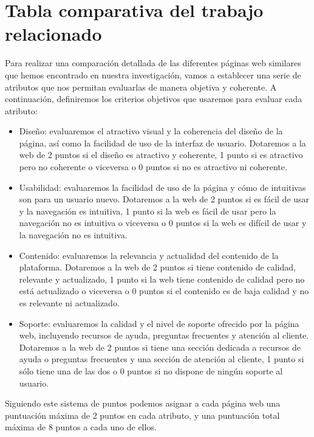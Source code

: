 \section{Tabla comparativa del trabajo relacionado}\label{sec:comparativa-trabajo-relacionado}

Para realizar una comparación detallada de las diferentes páginas web similares que hemos encontrado en nuestra investigación, vamos a establecer una serie de atributos que nos permitan evaluarlas de manera objetiva y coherente. A continuación, definiremos los criterios objetivos que usaremos para evaluar cada atributo:

\begin{itemize}

	\item Diseño: evaluaremos el atractivo visual y la coherencia del diseño de la página, así como la facilidad de uso de la interfaz de usuario. Dotaremos a la web de 2 puntos si el diseño es atractivo y coherente, 1 punto si es atractivo pero no coherente o viceversa o 0 puntos si no es atractivo ni coherente.

	\item Usabilidad: evaluaremos la facilidad de uso de la página y cómo de intuitivas son para un usuario nuevo. Dotaremos a la web de 2 puntos si es fácil de usar y la navegación es intuitiva, 1 punto si la web es fácil de usar pero la navegación no es intuitiva o viceversa o 0 puntos si la web es difícil de usar y la navegación no es intuitiva.

	\item Contenido: evaluaremos la relevancia y actualidad del contenido de la plataforma. Dotaremos a la web de 2 puntos si tiene contenido de calidad, relevante y actualizado, 1 punto si la web tiene contenido de calidad pero no está actualizado o viceversa o 0 puntos si el contenido es de baja calidad y no es relevante ni actualizado.

	\item Soporte: evaluaremos la calidad y el nivel de soporte ofrecido por la página web, incluyendo recursos de ayuda, preguntas frecuentes y atención al cliente. Dotaremos a la web de 2 puntos si tiene una sección dedicada a recursos de ayuda o preguntas frecuentes y una sección de atención al cliente, 1 punto si sólo tiene una de las dos o 0 puntos si no dispone de ningún soporte al usuario.

\end{itemize}

Siguiendo este sistema de puntos podemos asignar a cada página web una puntuación máxima de 2 puntos en cada atributo, y una puntuación total máxima de 8 puntos a cada uno de ellos.


